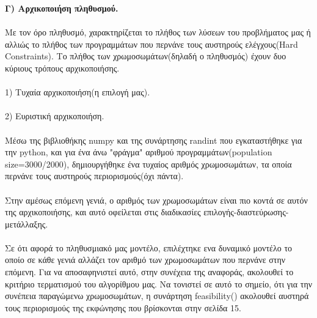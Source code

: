 \documentclass[12pt]{article}
\begin{document}
{\bfseries Γ) Αρχικοποιήση πληθυσμού.}\\\\
Με τον όρο πληθυσμό, χαρακτηρίζεται το πλήθος των λύσεων του προβλήματος μας ή αλλιώς το πλήθος των προγραμμάτων που περνάνε τους αυστηρούς ελέγχους(Hard Constraints). Το πλήθος των χρωμοσωμάτων(δηλαδή ο πληθυσμός) έχουν δυο κύριους τρόπους αρχικοποιήσης.\\\\
1) Τυχαία αρχικοποιήση(η επιλογή μας).\\\\
2) Ευριστική αρχικοποιήση.\\\\
Μέσω της βιβλιοθήκης numpy και της συνάρτησης randint που εγκαταστήθηκε για την python, και για ένα άνω "φράγμα" αριθμού προγραμμάτων(population size=3000/2000), δημιουργήθηκε ένα τυχαίος αριθμός χρωμοσωμάτων, τα οποία περνάνε τους αυστηρούς περιορισμούς(όχι πάντα).\\\\
Στην αμέσως επόμενη γενιά, ο αριθμός των χρωμοσωμάτων είναι πιο κοντά σε αυτόν της αρχικοποιήσης, και αυτό οφείλεται στις διαδικασίες επιλογής-διαστεύρωσης-μετάλλαξης.\\\\
Σε ότι αφορά το πληθυσμιακό μας μοντέλο, επιλέχτηκε ενα δυναμικό μοντέλο το οποίο σε κάθε γενιά αλλάζει τον αριθμό των χρωμοσωμάτων που περνάνε στην επόμενη. Για να αποσαφηνιστεί αυτό, στην συνέχεια της αναφοράς, ακολουθεί το κριτήριο τερματισμού του αλγορίθμου μας. Να τονιστεί σε αυτό το σημείο, ότι για την συνέπεια παραγώμενω χρωμοσωμάτων, η συνάρτηση feasibility() ακολουθεί αυστηρά τους περιορισμούς της εκφώνησης που βρίσκονται στην σελίδα 15.\\\\
\end{document}
